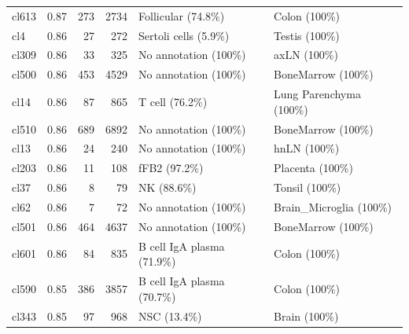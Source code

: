 \begin{table}[ht!]
\begin{tabular}{lrrrll}
  cl613 & 0.87 & 273 & 2734 & Follicular (74.8\%) & Colon (100\%) \\ 
  cl4 & 0.86 &  27 & 272 & Sertoli cells (5.9\%) & Testis (100\%) \\ 
  cl309 & 0.86 &  33 & 325 & No annotation (100\%) & axLN (100\%) \\ 
  cl500 & 0.86 & 453 & 4529 & No annotation (100\%) & BoneMarrow (100\%) \\ 
  cl14 & 0.86 &  87 & 865 & T cell (76.2\%) & Lung Parenchyma (100\%) \\ 
  cl510 & 0.86 & 689 & 6892 & No annotation (100\%) & BoneMarrow (100\%) \\ 
  cl13 & 0.86 &  24 & 240 & No annotation (100\%) & hnLN (100\%) \\ 
  cl203 & 0.86 &  11 & 108 & fFB2 (97.2\%) & Placenta (100\%) \\ 
  cl37 & 0.86 &   8 &  79 & NK (88.6\%) & Tonsil (100\%) \\ 
  cl62 & 0.86 &   7 &  72 & No annotation (100\%) & Brain\_Microglia (100\%) \\ 
  cl501 & 0.86 & 464 & 4637 & No annotation (100\%) & BoneMarrow (100\%) \\ 
  cl601 & 0.86 &  84 & 835 & B cell IgA plasma (71.9\%) & Colon (100\%) \\ 
  cl590 & 0.85 & 386 & 3857 & B cell IgA plasma (70.7\%) & Colon (100\%) \\ 
  cl343 & 0.85 &  97 & 968 & NSC (13.4\%) & Brain (100\%) \\ 
   \bottomrule
\end{tabular}
\end{table}  
  
